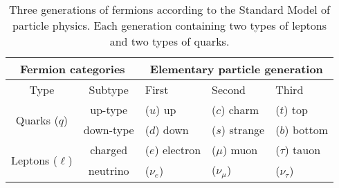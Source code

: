 \begin{table}[h!]
\centering
	{\small
	\begin{tabular}{|c||c||l|l|l|}
		\hline \multicolumn{2}{|c||}{ \textbf{Fermion categories} } & \multicolumn{3}{c|}{\textbf{ Elementary particle generation} } \bigstrut\\
		\hline \hline Type & Subtype & First & Second & Third \bigstrut\\
		\hline\hline \multirow{2}{*}{ Quarks ($q$) }  & up-type & ($u$) up & ($c$) charm & ($t$) top  \bigstrut \\
		\cline { 2 - 5 }  & down-type & ($d$) down & ($s$) strange & ($b$) bottom  \bigstrut\\
		\hline\hline \multirow{2}{*}{ Leptons ($\ell$) } & charged & ($e$) electron & ($\mu$) muon & ($\tau$) tauon \bigstrut\\
		\cline { 2 - 5 } & neutrino & ($\nu_e$) & ($\nu_\mu$) & ($\nu_\tau$) \bigstrut\\
		\hline
	\end{tabular}
	}
	\caption{Three generations of fermions according to the Standard Model of particle physics. Each generation containing two types of leptons and two types of quarks.}\label{tab-generations}
\end{table}

